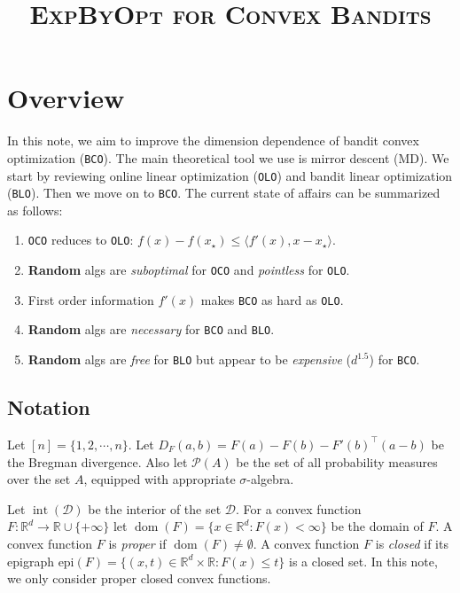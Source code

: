 \documentclass{article}
\title{\textsc{ExpByOpt for Convex Bandits}}
\theoremstyle{plain}
\theoremstyle{definition}
\newcommand{\dom}[1]{\operatorname{dom}(#1)}
\newcommand{\R}{\mathbb R}
\newcommand{\Rd}{\mathbb{R}^d}
\newcommand{\cD}{\mathcal D}
\newcommand{\cP}{\mathcal P}
\newcommand{\interior}{\operatorname{int}}
\newcommand{\mdalg}{\textsf{MD}\xspace}
\newcommand{\olo}{\texttt{OLO}\xspace}
\newcommand{\blo}{\texttt{BLO}\xspace}
\newcommand{\bco}{\texttt{BCO}\xspace}
\newcommand{\oco}{\texttt{OCO}\xspace}
\begin{document}
\maketitle

\section{Overview}
In this note, we aim to improve the dimension dependence of bandit convex optimization (\bco).
The main theoretical tool we use is mirror descent (\mdalg).
We start by reviewing online linear optimization (\olo) and bandit linear optimization (\blo).
Then we move on to \bco.
The current state of affairs can be summarized as follows:
\begin{enumerate}
    \item \oco reduces to \olo: $f(x) - f(x_\star) \leq \langle f'(x), x - x_\star \rangle$.
    \item \textbf{Random} algs are \textit{suboptimal} for \texttt{OCO} and \textit{pointless} for \texttt{OLO}.
    \item First order information $f'(x)$ makes \texttt{BCO} as hard as \texttt{OLO}.
    \item \textbf{Random} algs are \textit{necessary} for \texttt{BCO} and \texttt{BLO}.
    \item \textbf{Random} algs are \textit{free} for \texttt{BLO} but appear to be \textit{expensive} ($d^{1.5}$) for \texttt{BCO}.
\end{enumerate}
\subsection{Notation}
Let $[n] = \{1,2, \cdots, n\}$.
Let $D_F(a, b) = F(a) - F(b) - F'(b)^\top (a - b)$ be the Bregman divergence.
Also let $\cP(A)$ be the set of all probability measures over the set $A$,
equipped with appropriate $\sigma$-algebra.

Let $\interior(\cD)$ be the interior of the set $\cD$.
For a convex function $F: \Rd \to \R \cup \{+\infty\}$
let $\dom{F} = \{x \in \Rd: F(x) < \infty\}$ be the domain of $F$.
A convex function $F$ is \emph{proper} if $\dom{F} \neq \emptyset$.
A convex function $F$ is \emph{closed} if its epigraph $\text{epi}(F) = \{(x, t) \in \Rd \times \R: F(x) \leq t\}$ is a closed set.
In this note, we only consider proper closed convex functions.
\end{document}
